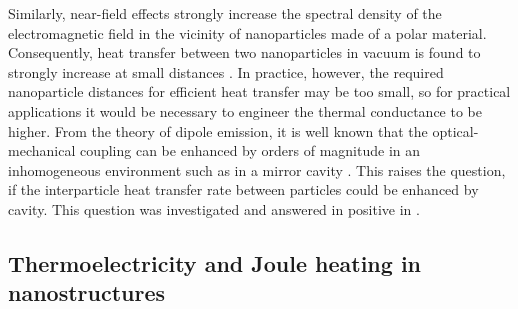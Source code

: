 Similarly, near-field effects strongly increase the spectral density of the electromagnetic field in the vicinity of nanoparticles made of a polar material. Consequently, heat transfer between two nanoparticles in vacuum is found to strongly increase at small distances \cite{domingues05}. In practice, however, the required nanoparticle distances for efficient heat transfer may be too small, so for practical applications it would be necessary to engineer the thermal conductance to be higher. From the theory of dipole emission, it is well known that the optical-mechanical coupling can be enhanced by orders of magnitude in an inhomogeneous environment such as in a mirror cavity \cite{novotny}. This raises the question, if the interparticle heat transfer rate between particles could be enhanced by cavity. This question was investigated and answered in positive in .


\subsection{Thermoelectricity and Joule heating in nanostructures}







